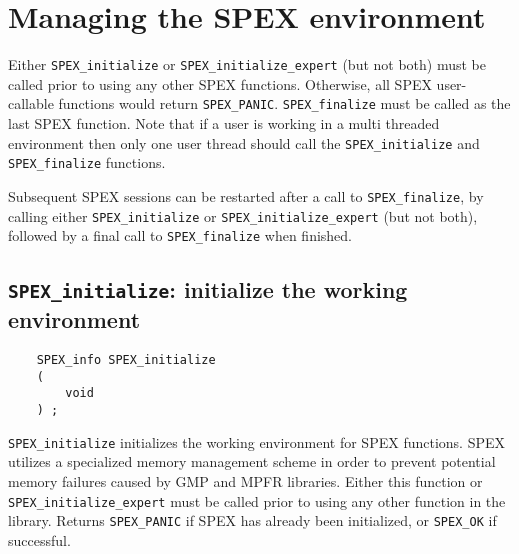 \documentclass[12pt]{report}
\theoremstyle{definition}
\begin{document}
\section{Managing the SPEX environment} \label{s:user:setup}



Either \verb|SPEX_initialize| or \verb|SPEX_initialize_expert| (but not both)
must be called prior to using any other SPEX functions. Otherwise, all SPEX user-callable functions would return \verb|SPEX_PANIC|. \verb|SPEX_finalize|
must be called as the last SPEX function. 
Note that if a user is working in a multi threaded environment then only one user thread should call the \verb|SPEX_initialize| and \verb|SPEX_finalize| functions.

Subsequent SPEX sessions can be restarted after a call to
\verb|SPEX_finalize|, by calling either \verb|SPEX_initialize| or
\verb|SPEX_initialize_expert| (but not both), followed by a final call to
\verb|SPEX_finalize| when finished.

\newpage
\subsection{\texttt{SPEX\_initialize}: initialize the working environment}

\begin{mdframed}[userdefinedwidth=6in]
{\footnotesize
\begin{verbatim}
    SPEX_info SPEX_initialize
    (
        void
    ) ;
\end{verbatim}
} \end{mdframed}

\verb|SPEX_initialize| initializes the working environment for SPEX
functions.  SPEX utilizes a specialized memory management scheme in order to
prevent potential memory failures caused by GMP and MPFR libraries.  Either
this function or \verb|SPEX_initialize_expert| must be called prior to using
any other function in the library.  Returns \verb|SPEX_PANIC| if SPEX has
already been initialized, or \verb|SPEX_OK| if successful.
\end{document}
